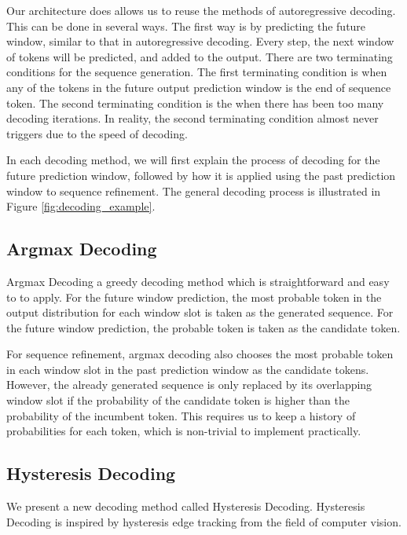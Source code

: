 Our architecture does allows us to reuse the methods of autoregressive decoding. This can be done in several ways. The first way is by predicting the future window, similar to that in autoregressive decoding. Every step, the next window of tokens will be predicted, and added to the output. There are two terminating conditions for the sequence generation. The first terminating condition is when any of the tokens in the future output prediction window is the end of sequence token. The second terminating condition is the when there has been too many decoding iterations. In reality, the second terminating condition almost never triggers due to the speed of decoding.

In each decoding method, we will first explain the process of decoding for the future prediction window, followed by how it is applied using the past prediction window to sequence refinement. The general decoding process is illustrated in Figure \ref{fig:decoding_example}.

\subsection{Argmax Decoding} \label{subsec:argmax_decoding}
Argmax Decoding a greedy decoding method which is straightforward and easy to to apply. For the future window prediction, the most probable token in the output distribution for each window slot is taken as the generated sequence. For the future window prediction, the probable token is taken as the candidate token.

For sequence refinement, argmax decoding also chooses the most probable token in each window slot in the past prediction window as the candidate tokens. However, the already generated sequence is only replaced by its overlapping window slot if the probability of the candidate token is higher than the probability of the incumbent token. This requires us to keep a history of probabilities for each token, which is non-trivial to implement practically.

\subsection{Hysteresis Decoding} \label{subsec:hysteresis_decoding}
We present a new decoding method called Hysteresis Decoding. Hysteresis Decoding is inspired by hysteresis edge tracking from the field of computer vision.

